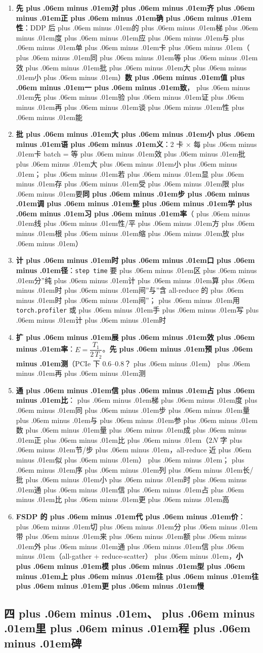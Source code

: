 \documentclass[
]{article}
\newcommand{\passthrough}[1]{#1}
\providecommand{\tightlist}{%
  \setlength{\itemsep}{0pt}\setlength{\parskip}{0pt}}
\def\zh#1{{\zhfont #1}}
\def\sym#1{{\symfont #1}}
\def\zhglue{\hskip0pt plus .06em minus .01em}
\begin{document}
\begin{enumerate}
\def\labelenumi{\arabic{enumi}.}
\tightlist
\item
  \textbf{\zh{先\zhglue 对\zhglue 齐\zhglue 正\zhglue 确\zhglue 性}}\zh{：}DDP \zh{后\zhglue 的\zhglue 梯\zhglue 度\zhglue 应\zhglue 与\zhglue 单\zhglue 卡\zhglue （\zhglue 同\zhglue 等\zhglue 效\zhglue 批\zhglue 大\zhglue 小\zhglue ）}\textbf{\zh{数\zhglue 值\zhglue 一\zhglue 致}}\zh{，\zhglue 先\zhglue 验\zhglue 证\zhglue 再\zhglue 谈\zhglue 性\zhglue 能}
\item
  \textbf{\zh{批\zhglue 大\zhglue 小\zhglue 语\zhglue 义}}\zh{：}2 \zh{卡} \sym{×} \zh{每\zhglue 卡} batch = \zh{等\zhglue 效\zhglue 批\zhglue 大\zhglue 小\zhglue ；\zhglue 若\zhglue 显\zhglue 存\zhglue 受\zhglue 限\zhglue 要}\textbf{\zh{同\zhglue 步\zhglue 调\zhglue 整\zhglue 学\zhglue 习\zhglue 率}}\zh{（\zhglue 线\zhglue 性}/\zh{平\zhglue 方\zhglue 根\zhglue 缩\zhglue 放\zhglue ）}
\item
  \textbf{\zh{计\zhglue 时\zhglue 口\zhglue 径}}\zh{：}\passthrough{\lstinline!step time!} \zh{要\zhglue 区\zhglue 分}''\zh{纯\zhglue 计\zhglue 算\zhglue 时\zhglue 间}''\zh{与}''\zh{含} all-reduce \zh{的\zhglue 时\zhglue 间}''\zh{；\zhglue 用} \passthrough{\lstinline!torch.profiler!} \zh{或\zhglue 手\zhglue 写\zhglue 计\zhglue 时}
\item
  \textbf{\zh{扩\zhglue 展\zhglue 效\zhglue 率}}\zh{：}\(E = \dfrac{T_1}{2\,T_2}\)\zh{。}\textbf{\zh{先\zhglue 预\zhglue 测}}\zh{（}PCIe \zh{下} 0.6--0.8\zh{？\zhglue ）\zhglue 再\zhglue 测}
\item
  \textbf{\zh{通\zhglue 信\zhglue 占\zhglue 比}}\zh{：\zhglue 梯\zhglue 度\zhglue 同\zhglue 步\zhglue 量\zhglue 与\zhglue 参\zhglue 数\zhglue 量\zhglue 成\zhglue 正\zhglue 比\zhglue （}\(2N\) \zh{字\zhglue 节}/\zh{步\zhglue ，}all-reduce \zh{近\zhglue 似\zhglue ）\zhglue ；\zhglue 序\zhglue 列\zhglue 长}/\zh{批\zhglue 小\zhglue 时\zhglue 通\zhglue 信\zhglue 占\zhglue 比\zhglue 更\zhglue 高}
\item
  \textbf{FSDP \zh{的\zhglue 代\zhglue 价}}\zh{：\zhglue 切\zhglue 分\zhglue 带\zhglue 来\zhglue 额\zhglue 外\zhglue 通\zhglue 信\zhglue （}all-gather + reduce-scatter\zh{）\zhglue ，}\textbf{\zh{小\zhglue 模\zhglue 型\zhglue 上\zhglue 往\zhglue 往\zhglue 更\zhglue 慢}}
\end{enumerate}

\subsection{\zh{四\zhglue 、\zhglue 里\zhglue 程\zhglue 碑}}\label{ux56dbux91ccux7a0bux7891}
\end{document}
